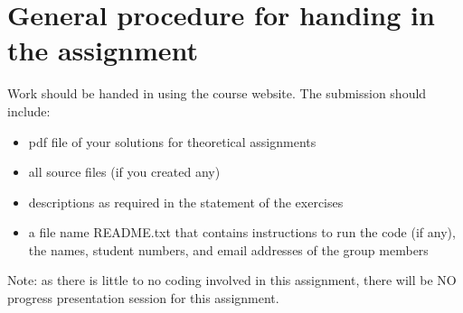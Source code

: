 \documentclass{pracs}
\begin{document}
\section{General procedure for handing in the assignment}
Work should be handed in using the course website. The submission should include:
\begin{itemize}
\item pdf file of your solutions for theoretical assignments
\item all source files (if you created any)
\item descriptions as required in the statement of the exercises
\item a file name README.txt that contains instructions to run the code (if any), the names, student numbers, and email addresses of the group members
\end{itemize}

Note: as there is little to no coding involved in this assignment, there will be NO progress presentation session for this assignment.

%
\end{document}
